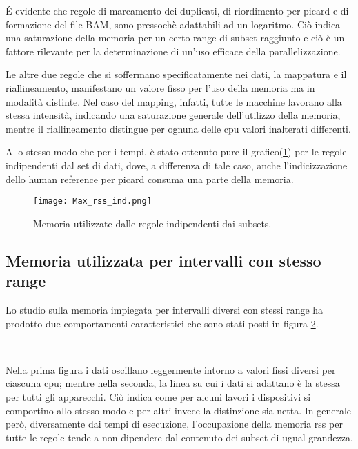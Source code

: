 \'E evidente che regole di marcamento dei duplicati, di riordimento per picard e di formazione del file BAM, sono pressochè adattabili ad un logaritmo. 
Ciò indica una saturazione della memoria per un certo range di subset raggiunto e ciò è un fattore rilevante per la determinazione di un'uso efficace della parallelizzazione.

Le altre due regole che si soffermano specificatamente nei dati, la mappatura e il riallineamento, manifestano un valore fisso per l'uso della memoria ma in modalità distinte.
Nel caso del mapping, infatti, tutte le macchine lavorano alla stessa intensità, indicando una saturazione generale dell'utilizzo della memoria, mentre il riallineamento distingue per ognuna delle cpu valori inalterati differenti. 

Allo stesso modo che per i tempi, è stato ottenuto pure il grafico(\ref{fig:RSSind}) per le regole indipendenti dal set di dati, dove, a differenza di tale caso, anche l'indicizzazione dello human reference per picard consuma una parte della memoria.

\begin{figure}[H]
\centering
\texttt{[image: Max\_rss\_ind.png]}
\caption{Memoria utilizzate dalle regole indipendenti dai subsets.}
\label{fig:RSSind}
\end{figure}

\subsection{Memoria utilizzata per intervalli con stesso range}
Lo studio sulla memoria impiegata per intervalli diversi con stessi range ha prodotto due comportamenti caratteristici che sono stati posti in figura \ref{fig:RSSrng}.
\begin{figure}[H]
\centering
{} \quad
{} \\
\caption{}
\label{fig:RSSrng}
\end{figure}

Nella prima figura i dati oscillano leggermente intorno a valori fissi diversi per ciascuna cpu; mentre nella seconda, la linea su cui i dati si adattano è la stessa per tutti gli apparecchi.
Ciò indica come per alcuni lavori i dispositivi si comportino allo stesso modo e per altri invece la distinzione sia netta. 
In generale però, diversamente dai tempi di esecuzione, l'occupazione della memoria rss  per tutte le regole tende a non dipendere dal contenuto dei subset di ugual grandezza.

